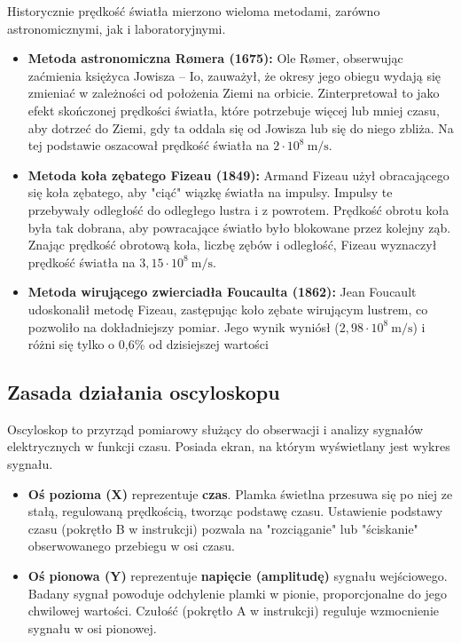 \documentclass[a4paper,12pt]{article}
\begin{document}
Historycznie prędkość światła mierzono wieloma metodami, zarówno astronomicznymi, jak i laboratoryjnymi.
\begin{itemize}
    \item \textbf{Metoda astronomiczna Rømera (1675):} Ole Rømer, obserwując zaćmienia księżyca Jowisza -- Io, zauważył, że okresy jego obiegu wydają się zmieniać w zależności od położenia Ziemi na orbicie. Zinterpretował to jako efekt skończonej prędkości światła, które potrzebuje więcej lub mniej czasu, aby dotrzeć do Ziemi, gdy ta oddala się od Jowisza lub się do niego zbliża. Na tej podstawie oszacował prędkość światła na $2 \cdot 10^8 \ \text{m/s}$.
    \item \textbf{Metoda koła zębatego Fizeau (1849):} Armand Fizeau użył obracającego się koła zębatego, aby "ciąć" wiązkę światła na impulsy. Impulsy te przebywały odległość do odległego lustra i z powrotem. Prędkość obrotu koła była tak dobrana, aby powracające światło było blokowane przez kolejny ząb. Znając prędkość obrotową koła, liczbę zębów i odległość, Fizeau wyznaczył prędkość światła na $3,15 \cdot 10^8 \ \text{m/s}$.
    \item \textbf{Metoda wirującego zwierciadła Foucaulta (1862):} Jean Foucault udoskonalił metodę Fizeau, zastępując koło zębate wirującym lustrem, co pozwoliło na dokładniejszy pomiar. Jego wynik wyniósł ($2,98 \cdot 10^8 \ \text{m/s}$) i różni się tylko o 0,6\% od dzisiejszej wartości~\citep{fizyka_dla_szkol_wyzszych_tom_3}
\end{itemize}

\subsection*{Zasada działania oscyloskopu}

Oscyloskop to przyrząd pomiarowy służący do obserwacji i analizy sygnałów elektrycznych w funkcji czasu. Posiada ekran, na którym wyświetlany jest wykres sygnału.

\begin{itemize}
    \item \textbf{Oś pozioma (X)} reprezentuje \textbf{czas}. Plamka świetlna przesuwa się po niej ze stałą, regulowaną prędkością, tworząc podstawę czasu. Ustawienie podstawy czasu (pokrętło B w instrukcji) pozwala na "rozciąganie" lub "ściskanie" obserwowanego przebiegu w osi czasu.
    \item \textbf{Oś pionowa (Y)} reprezentuje \textbf{napięcie (amplitudę)} sygnału wejściowego. Badany sygnał powoduje odchylenie plamki w pionie, proporcjonalne do jego chwilowej wartości. Czułość (pokrętło A w instrukcji) reguluje wzmocnienie sygnału w osi pionowej.
\end{itemize}
\end{document}

